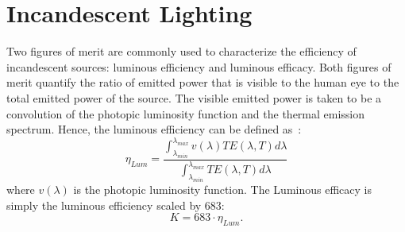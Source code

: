 \documentclass[journal=jpclcd,manuscript=suppinfo]{achemso}
\begin{document}
\section{Incandescent Lighting}
Two figures of merit are commonly used to characterize the efficiency of incandescent sources: luminous efficiency and
luminous efficacy.  Both figures of merit quantify the ratio of emitted power that is visible to the human eye to 
the total emitted power of the source.  The visible emitted power is taken to be a convolution of the photopic luminosity function
and the thermal emission spectrum.  Hence, the luminous efficiency can be defined as~\cite{IBC_NatNano_2016}:
\begin{equation}
\eta_{Lum} = \frac{ \int_{\lambda_{min}}^{\lambda_{max}} v(\lambda) TE(\lambda, T) d\lambda }{ \int_{\lambda_{min}}^{\lambda_{max}} TE(\lambda, T) d\lambda  } 
\end{equation}
where $v(\lambda)$ is the photopic luminosity function.  The Luminous efficacy is simply the luminous efficiency scaled by 683:
\begin{equation}
K = 683 \cdot \eta_{Lum}.
\end{equation} 
\end{document}
